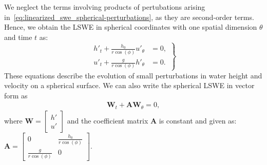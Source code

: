 We neglect the terms involving products of pertubations arising in~\eqref{eq:linearized_swe_spherical-perturbations}, as they are second-order terms.
Hence, we obtain the LSWE in spherical coordinates with one spatial dimension $\theta$ and time $t$ as:
\begin{equation}\label{eq:linearized_swe_spherical}
    \left.
    \begin{aligned}
        h'_t + \frac{h_0}{r \cos(\phi)} u'_\theta &= 0, \\
        u'_t + \frac{g}{r \cos(\phi)} h'_\theta &= 0.
    \end{aligned}
    \right\}
\end{equation}
These equations describe the evolution of small perturbations in water height and velocity on a spherical surface.
We can also write the spherical LSWE in vector form as
\begin{align}\label{eq:linearized_swe_spherical_vector}
    \mathbf{W}_t + \mathbf{A} \mathbf{W}_\theta = 0,
\end{align}
where $\mathbf{W} =
\begin{bmatrix} h' \\ u' \end{bmatrix}$ and the coefficient matrix $\mathbf{A}$ is constant and given as:
$\mathbf{A} = \begin{bmatrix} 0 & \frac{h_0}{r \cos(\phi)} \\ \frac{g}{r \cos (\phi)} & 0 \end{bmatrix}$.


